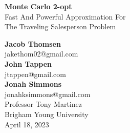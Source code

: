 \documentclass[12pt]{report}
\begin{document}
\begin{titlepage}
    \begin{center}
        \vspace*{1cm}
        \Huge
        \textbf{Monte Carlo 2-opt} \\

        \vspace{0.5cm}
        \large
        Fast And Powerful Approximation For \\
        The Traveling Salesperson Problem
            
        \vspace{1.5cm}

        \textbf{Jacob Thomsen} \\
        jakethom02@gmail.com \\
        \vspace{0.5cm}
        \textbf{John Tappen} \\
        jtappen@gmail.com \\
        \vspace{0.5cm}
        \textbf{Jonah Simmons} \\
        jonahksimmons@gmail.com \\

        \vfill
        Professor Tony Martinez \\
        Brigham Young University \\
        April 18, 2023
        \normalsize
    \end{center}
\end{titlepage}
\end{document}
